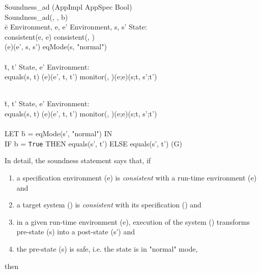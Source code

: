 \documentclass[conference]{IEEEtran}
\begin{document}
\begin{tabbing}
Soundness\_ad  (AppImpl  AppSpec  Bool)
\\Soundness\_ad(, , b) 
\\ \=e  Environment, e, e'  Environment, s, s'  State:
\\\>consistent(e, e)  consistent(, )  
\\\>\textlbrackdbl \textrbrackdbl(e)(e', s, s')  eqMode(s, "normal")
\\
\\\> \=t, t'  State, e'  Environment: 
\\\>\>equals(s, t)  \textlbrackdbl \textrbrackdbl(e)(e', t, t')  monitor(, )(e;e)(s;t, s';t')

\\\> \=t, t'  State, e'  Environment: 
\\\>\>equals(s, t)  \textlbrackdbl \textrbrackdbl(e)(e', t, t')  monitor(, )(e;e)(s;t, s';t')
\\\> \=
\\\> LET \=b = eqMode(s', "normal") IN
\\\>\>IF b = \texttt{True} THEN equals(s', t') ELSE  equals(s', t')  \hspace*{0.2cm} (G)
\end{tabbing}

In detail, the soundness statement says that, if
\begin{enumerate}
\item a specification environment (e) is \emph{consistent} with a run-time environment (e) and
\item a target system () is \emph{consistent} with its specification () and
\item in a given run-time environment (e), execution of the system () transforms pre-state (s) into a post-state (s') and
\item the pre-state (s) is safe, i.e. the state is in "normal" mode,
\end{enumerate}
then 
\end{document}
